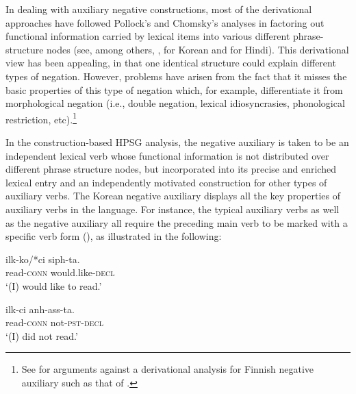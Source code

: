 \documentclass[output=paper]{langsci/langscibook}
\begin{document}
{In dealing with auxiliary negative constructions,
most of the derivational approaches have
followed Pollock's and Chomsky's analyses in factoring out functional
information carried by lexical items into
various different phrase-structure nodes (see, among others, \citet{Hagstrom:97,Hagstrom:02}, \citet{Han:07} for Korean and \citet{Vasishth:00} for Hindi).
%
%
This derivational view has
been appealing, in that one identical structure could explain
different types of negation.   However,
problems have arisen from the fact that it misses the basic properties
of this type of negation which, for example, differentiate it from
morphological negation (i.e., double negation, lexical
idiosyncrasies, phonological restriction, etc).\footnote{See \citet{Nino:94} for arguments against a derivational analysis
for Finnish negative auxiliary such as that of \citet{Mitchell:91}.}


In the construction-based HPSG analysis, the
negative auxiliary is taken to be an independent lexical
verb whose functional information is not distributed
over different phrase structure nodes, but incorporated into
its precise and enriched lexical entry and an independently
motivated construction for other types of auxiliary verbs.
The Korean negative auxiliary displays all the key properties of auxiliary verbs in the language. For instance, the typical auxiliary verbs as
well as the negative auxiliary all require the preceding main verb to be marked with a specific verb form (\vform), as illustrated
in the following:





\eal
\ex\label{14a}
\gll ilk-ko/*ci siph-ta. \\
     read-\textsc{conn} would.like-\textsc{decl} \\
\glt `(I) would like to read.'

\ex\label{14b}
\gll ilk-ci anh-ass-ta. \\
     read-\textsc{conn} not-\textsc{pst}-\textsc{decl} \\
\glt `(I) did not read.'
\zl


}
\end{document}
